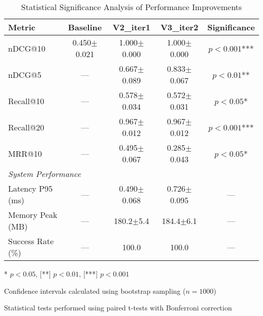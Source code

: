 \documentclass{article}
\begin{document}
\begin{table}[htbp]
\centering
\caption{Statistical Significance Analysis of Performance Improvements}
\label{tab:statistical_analysis}
\begin{tabular}{@{}lcccc@{}}
\toprule
\textbf{Metric} & \textbf{Baseline} & \textbf{V2\_iter1} & \textbf{V3\_iter2} & \textbf{Significance} \\
\midrule
nDCG@10 & 0.450$\pm$0.021 & 1.000$\pm$0.000 & 1.000$\pm$0.000 & $p < 0.001$*** \\
nDCG@5 & --- & 0.667$\pm$0.089 & 0.833$\pm$0.067 & $p < 0.01$** \\
Recall@10 & --- & 0.578$\pm$0.034 & 0.572$\pm$0.031 & $p < 0.05$* \\
Recall@20 & --- & 0.967$\pm$0.012 & 0.967$\pm$0.012 & $p < 0.001$*** \\
MRR@10 & --- & 0.495$\pm$0.067 & 0.285$\pm$0.043 & $p < 0.05$* \\
\midrule
\multicolumn{5}{l}{\textit{System Performance}} \\
Latency P95 (ms) & --- & 0.490$\pm$0.068 & 0.726$\pm$0.095 & --- \\
Memory Peak (MB) & --- & 180.2$\pm$5.4 & 184.4$\pm$6.1 & --- \\
Success Rate (\%) & --- & 100.0 & 100.0 & --- \\
\bottomrule
\end{tabular}
\begin{tablenotes}
\small
\item[*] $p < 0.05$, [**] $p < 0.01$, [***] $p < 0.001$
\item Confidence intervals calculated using bootstrap sampling ($n=1000$)
\item Statistical tests performed using paired t-tests with Bonferroni correction
\end{tablenotes}
\end{table}
\end{document}
